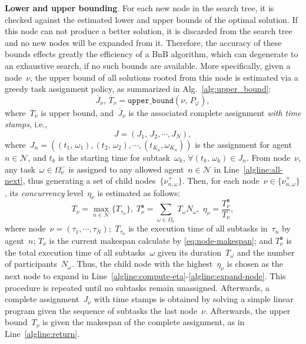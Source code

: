 \textbf{Lower and upper bounding}.
For each new node in the search tree, it is checked against the estimated lower
and upper bounds of the optimal solution.
If this node can not produce a better solution, it is discarded from the search
tree and no new nodes will be expanded from it.
Therefore, the accuracy of these bounds effects greatly the
efficiency of a BnB algorithm, which can degenerate to an exhaustive search,
if no such bounds are available.
More specifically, given a node~$\nu$,
the upper bound of all solutions rooted from this node
is estimated via a greedy task assignment policy,
as summarized in Alg.~\ref{alg:upper_bound}:
\begin{equation}\label{eq:upper-bound}
\overline{J}_\nu,\, \overline{T}_\nu  = \texttt{upper\_bound}(\nu,\, P_{\varphi}),
\end{equation}
where~$\overline{T}_\nu$ is upper bound, and~$\overline{J}_\nu$ is the
associated complete assignment \emph{with time stamps}, i.e.,
\begin{equation}\label{eq:complete-assignment}
J = (J_1,\,J_2,\cdots,J_N),
\end{equation}
where~$J_n=((t_1,\,\omega_1),(t_2,\,\omega_2),\cdots,(t_{K_n},\omega_{K_n}))$
is the assignment for agent~$n\in\mathcal{N}$,
and $t_k$ is the starting time for subtask~$\omega_k$,
$\forall (t_k,\,\omega_k)\in J_n$.
From node~$\nu$, any task~$\omega\in \Omega^-_\nu$ is assigned
to any allowed agent~$n\in\mathcal{N}$ in Line~\ref{algline:all-next},
thus generating a set of child nodes~$\{\nu^+_{n,\omega}\}$.
Then, for each node~$\nu\in \{\nu^+_{n,\omega}\}$,
its \emph{concurrency} level~$\eta_{\nu}$ is estimated as follows:
\begin{equation}\label{eq:node-makespan}
T_\nu = \max_{n\in\mathcal{N}} \{T_{\tau_n}\},\;
T^{\texttt{s}}_\nu = \sum_{\omega\in\Omega_\nu}\, T_{\omega}N_\omega,\;
\eta_\nu = \frac{T^{\texttt{s}}_\nu}{T_\nu},
\end{equation}
where node~$\nu=(\tau_1,\cdots,\tau_N)$;~$T_{\tau_n}$ is the execution
time of all subtasks in~$\tau_n$ by agent~$n$;
$T_\nu$ is the current makespan calculate by \eqref{eq:node-makespan};
and $T^{\texttt{s}}_\nu$ is the total execution time of all subtasks~$\omega$
given its duration~$T_\omega$ and the number of participants~$N_\omega$.
Thus, the child node with the highest~$\eta_{\nu}$ is chosen as
the next node to expand in Line~\ref{algline:compute-eta}-\ref{algline:expand-node}.
This procedure is repeated until no subtasks remain unassigned.
Afterwards, a complete assignment~$J_\nu$ with time stamps is obtained by
solving a simple linear program given the sequence of subtasks the last node~$\nu$.
Afterwards, the upper bound~$T_\nu$ is given the makespan of the
complete assignment, as in Line~\ref{algline:return}.

